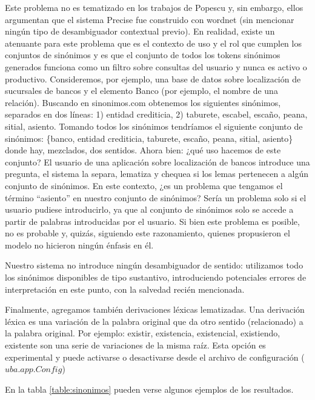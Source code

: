 Este problema no es tematizado en los trabajos de Popescu y, sin embargo, ellos argumentan que el sistema Precise fue construido con wordnet (sin  mencionar ningún tipo de desambiguador contextual previo).
En realidad, existe un atenuante para este problema que es el contexto de uso y el rol que cumplen los conjuntos de sinónimos y es que el conjunto de todos los tokens sinónimos generados funciona como un filtro sobre consultas del usuario y nunca es activo o productivo.
Consideremos, por ejemplo, una base de datos sobre localización de sucursales de bancos y el elemento Banco (por ejemplo, el nombre de una relación).
Buscando en sinonimos.com obtenemos los siguientes sinónimos, separados en dos líneas: 1) entidad crediticia, 2) taburete, escabel, escaño, peana, sitial, asiento. Tomando todos los sinónimos tendríamos el siguiente conjunto de sinónimos: \{banco, entidad crediticia, taburete, escaño, peana, sitial, asiento\} donde hay, mezclados, dos sentidos. Ahora bien: ¿qué uso hacemos de este conjunto? El usuario de una aplicación sobre localización de bancos introduce una pregunta, el sistema la separa, lematiza y chequea si los lemas pertenecen a algún conjunto de sinónimos. En este contexto, ¿es un problema que tengamos el término ``asiento'' en nuestro conjunto de sinónimos? Sería un problema solo si el usuario pudiese introducirlo, ya que al conjunto de sinónimos solo se accede a partir de palabras introducidas por el usuario. Si bien este problema es posible, no es probable y, quizás, siguiendo este razonamiento, quienes propusieron el modelo no hicieron ningún énfasis en él.

Nuestro sistema no introduce ningún desambiguador de sentido: utilizamos todo los sinónimos disponibles de tipo sustantivo, introduciendo potenciales errores de interpretación en este punto, con la salvedad recién mencionada.


Finalmente, agregamos también derivaciones léxicas lematizadas. Una derivación léxica es una variación de la palabra original que da otro sentido (relacionado) a la palabra original. Por ejemplo: existir, existencia, existencial, existiendo, existente son una serie de variaciones de la misma raíz.  Esta opción es experimental y puede activarse o desactivarse desde el archivo de configuración ($uba.app.Config$)

En la tabla \ref{table:sinonimos} pueden verse algunos ejemplos de los resultados.

